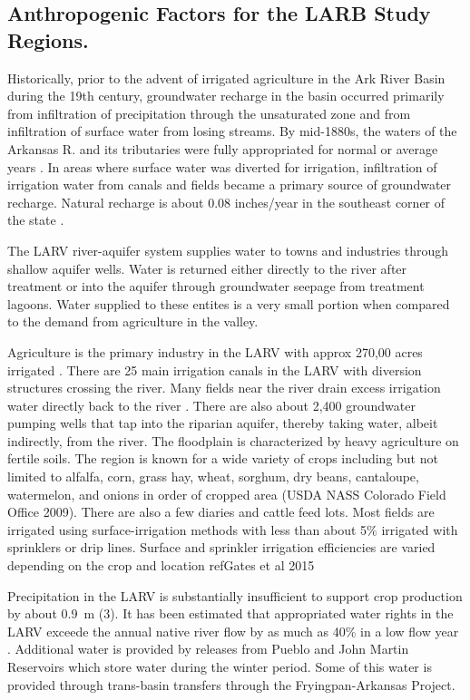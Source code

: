 \subsection*{Anthropogenic Factors for the LARB Study Regions.}

Historically, prior to the advent of irrigated agriculture in the Ark River Basin during the 19th century, groundwater recharge in the basin occurred primarily from infiltration of precipitation through the unsaturated zone and from infiltration of surface water from losing streams.  By mid-1880s, the waters of the Arkansas R. and its tributaries were fully appropriated for normal or average years \parencite{Abbott1985}.  In areas where surface water was diverted for irrigation, infiltration of irrigation water from canals and fields became a primary source of groundwater recharge.  Natural recharge is about 0.08 inches/year in the southeast corner of the state \parencite{Wolock2003}.

The LARV river-aquifer system supplies water to towns and industries through shallow aquifer wells.  Water is returned either directly to the river after treatment or into the aquifer through groundwater seepage from treatment lagoons.  Water supplied to these entites is a very small portion when compared to the demand from agriculture in the valley.

Agriculture is the primary industry in the LARV with approx 270,00 acres irrigated \parencite{Bailey2015,Miller2010}.  There are 25 main irrigation canals in the LARV with diversion structures crossing the river.  Many fields near the river drain excess irrigation water directly back to the river \parencite{Bailey2012,Morway2013}.  There are also about 2,400 groundwater pumping wells that tap into the riparian aquifer, thereby taking water, albeit indirectly, from the river.  The floodplain is characterized by heavy agriculture on fertile soils.  The region is known for a wide variety of crops including but not limited to alfalfa, corn, grass hay, wheat, sorghum, dry beans, cantaloupe, watermelon, and onions in order of cropped area (USDA NASS Colorado Field Office 2009).  There are also a few diaries and cattle feed lots.  Most fields are irrigated using surface-irrigation methods with less than about 5\% irrigated with sprinklers or drip lines.  Surface and sprinkler irrigation efficiencies are varied depending on the crop and location \parencite{Bailey2012Phd} ref{Gates et al 2015}

Precipitation in the LARV is substantially insufficient to support crop production by about \SI{0.9}{\meter} (\SI{3}{\foot}).  It has been estimated that appropriated water rights in the LARV exceede the annual native river flow by as much as 40\% in a low flow year \parencite{cain1985,sutherland1988}.  Additional water is provided by releases from Pueblo and John Martin Reservoirs which store water during the winter period.  Some of this water is provided through trans-basin transfers through the Fryingpan-Arkansas Project.


